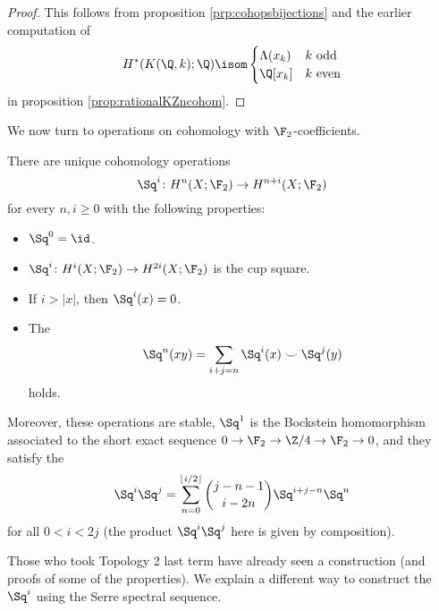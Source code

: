 \begin{proof}
	This follows from proposition \ref{prp:cohopsbijections} and the earlier computation of
	\begin{equation*}
		H^*(K(\Q, k); \Q) \isom \begin{cases}
			\Lambda(x_k) 	& k \text{ odd} \\
			\Q[x_k] 		& k \text{ even} 
		\end{cases}
	\end{equation*}
	in proposition \ref{prop:rationalKZncohom}.
\end{proof}

We now turn to operations on cohomology with $\F_2$-coefficients.
\begin{theorem}[Steenrod]
	There are unique cohomology operations
	\begin{equation*}
		\Sq^i\colon H^n(X; \F_2) \to H^{n + i}(X; \F_2)
	\end{equation*}
	for every $n, i \geq 0$ with the following properties:
	\begin{itemize}
		\item $\Sq^0 = \id$.
		\item $\Sq^i\colon H^i(X; \F_2) \to H^{2i}(X; \F_2)$ is the cup square.
		\item If $i > |x|$, then $\Sq^i(x) = 0$.
		\item The 
			\begin{equation*}
				\Sq^n(x y) = \sum_{i + j = n} \Sq^i(x) \smile \Sq^j(y)
			\end{equation*}
			holds.
	\end{itemize}
	Moreover, these operations are stable, $\Sq^1$ is the Bockstein homomorphism associated to the short exact sequence $0 \to \F_2 \to \Zn{4} \to \F_2 \to 0$, and they satisfy the 
	\begin{equation*}
		\Sq^i \Sq^j = \sum_{n = 0}^{\lfloor i / 2\rfloor} \binom{j - n - 1}{i - 2n} \Sq^{i + j - n} \Sq^n
	\end{equation*}
	for all $0 < i < 2j$ (the product $\Sq^i \Sq^j$ here is given by composition).
\end{theorem}
Those who took Topology 2 last term have already seen a construction (and proofs of some of the properties).
We explain a different way to construct the $\Sq^i$ using the Serre spectral sequence.

